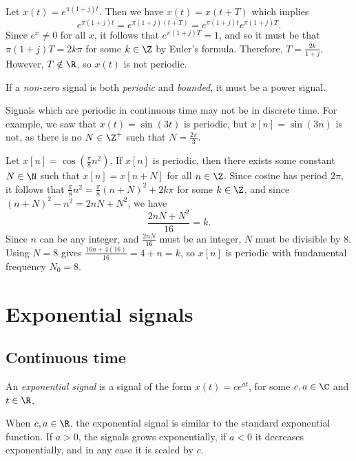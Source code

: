 \documentclass[12pt]{article}
\begin{document}
\begin{exmp}
    Let $x(t) = e^{\pi(1 + j)t}$. Then we have $x(t) = x(t + T)$ which implies \[e^{\pi(1 + j)t} = e^{\pi(1 + j)(t + T)} = e^{\pi(1 + j)t}e^{\pi(1 + j)T}.\] Since $e^x \neq 0$ for all $x$, it follows that $e^{\pi(1 + j)T} = 1$, and so it must be that $\pi(1 + j)T = 2k{\pi}$ for some $k \in \Z$ by Euler's formula. Therefore, $T = \frac{2k}{1 + j}$. However, $T \notin \R$, so $x(t)$ is not periodic.
\end{exmp}

\begin{rmk}
    If a \emph{non-zero} signal is both \emph{periodic} and \emph{bounded}, it must be a power signal.
\end{rmk}

\begin{rmk}
    Signals which are periodic in continuous time may not be in discrete time. For example, we saw that $x(t) = \sin(3t)$ is periodic, but $x[n] = \sin(3n)$ is not, as there is no $N \in \Z^+$ such that $N = \frac{2\pi}{3}$.
\end{rmk}

\begin{exmp}
    Let $x[n] = \cos(\frac{\pi}{8}n^2)$. If $x[n]$ is periodic, then there exists some constant $N \in \N$ such that $x[n] = x[n+N]$ for all $n \in \Z$. Since cosine has period $2\pi$, it follows that
    $\frac{\pi}{8}n^2 = \frac{\pi}{8}(n+N)^2 + 2k\pi$ for some $k \in \Z$, and since $(n+N)^2 - n^2 = 2nN + N^2$, we have \[\frac{2nN+N^2}{16} = k.\] Since $n$ can be any integer, and $\frac{2nN}{16}$ must be an integer, $N$ must be divisible by $8$. Using $N = 8$ gives $\frac{16n + 4(16)}{16} = 4 + n = k$, so $x[n]$ is periodic with fundamental frequency $N_0 = 8$.
\end{exmp}

\section{Exponential signals}

\subsection{Continuous time}

\begin{defn}
    An \emph{exponential signal} is a signal of the form $x(t) = ce^{at}$, for some $c, a \in \C$ and $t \in \R$.
\end{defn}

When $c, a \in \R$, the exponential signal is similar to the standard exponential function. If $a > 0$, the signals grows exponentially, if $a < 0$ it decreases exponentially, and in any case it is scaled by $c$.
\end{document}
